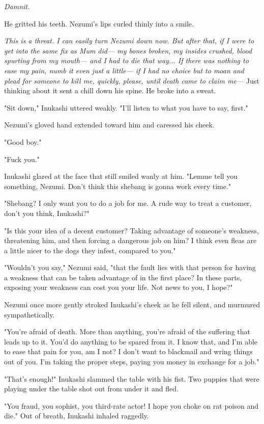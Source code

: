 \emph{Damnit.}

He gritted his teeth. Nezumi's lips curled thinly into a smile.

\emph{This is a threat. I can easily turn Nezumi down now. But after that, if
I were to get into the same fix as Mum did--- my bones broken, my insides
crushed, blood spurting from my mouth--- and I had to die that way... If
there was nothing to ease my pain, numb it even just a little--- if I had
no choice but to moan and plead for someone to kill me, quickly, please,
until death came to claim me---} Just thinking about it sent a chill down
his spine. He broke into a sweat.

"Sit down," Inukashi uttered weakly. "I'll listen to what you have to
say, first."

Nezumi's gloved hand extended toward him and caressed his cheek.

"Good boy."

"Fuck you."

Inukashi glared at the face that still smiled wanly at him. "Lemme tell
you something, Nezumi. Don't think this shebang is gonna work every
time."

"Shebang? I only want you to do a job for me. A rude way to treat a
customer, don't you think, Inukashi?"

"Is this your idea of a decent customer? Taking advantage of someone's
weakness, threatening him, and then forcing a dangerous job on him? I
think even fleas are a little nicer to the dogs they infest, compared to
you."

"Wouldn't you say," Nezumi said, "that the fault lies with that person
for having a weakness that can be taken advantage of in the first place?
In these parts, exposing your weakness can cost you your life. Not news
to you, I hope?"

Nezumi once more gently stroked Inukashi's cheek as he fell silent, and
murmured sympathetically.

"You're afraid of death. More than anything, you're afraid of the
suffering that leads up to it. You'd do anything to be spared from it. I
know that, and I'm able to ease that pain for you, am I not? I don't
want to blackmail and wring things out of you. I'm taking the proper
steps, paying you money in exchange for a job."

"That's enough!" Inukashi slammed the table with his fist. Two puppies
that were playing under the table shot out from under it and fled.

"You fraud, you sophist, you third-rate actor! I hope you choke on rat
poison and die." Out of breath, Inukashi inhaled raggedly.

